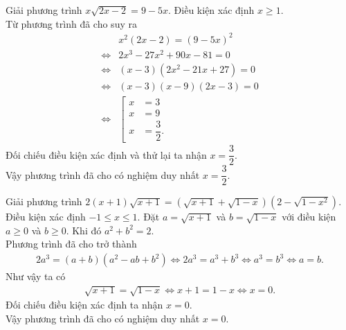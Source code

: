 \begin{bt}%
	Giải phương trình $x \sqrt{2x - 2} = 9 - 5x$.
	\loigiai
	{
		Điều kiện xác định $x \geq 1$.\\
		Từ phương trình đã cho suy ra
		\begin{align*}
		& x^2(2x - 2) = (9 - 5x)^2 \\
		\Leftrightarrow & 2x^3 - 27x^2 + 90x - 81 = 0 \\
		\Leftrightarrow & (x - 3)(2x^2 - 21x + 27) = 0 \\
		\Leftrightarrow & (x - 3)(x - 9)(2x - 3) = 0 \\
		\Leftrightarrow & \left[\begin{aligned} x &= 3 \\ x &= 9 \\ x &= \dfrac{3}{2}. \end{aligned}\right.
		\end{align*}
		Đối chiếu điều kiện xác định và thử lại ta nhận $x = \dfrac{3}{2}$.\\
		Vậy phương trình đã cho có nghiệm duy nhất $x = \dfrac{3}{2}$.
	}
\end{bt}


\begin{bt}%
	Giải phương trình $2(x + 1) \sqrt{x + 1} = \left( \sqrt{x + 1} + \sqrt{1 - x} \right)\left( 2 - \sqrt{1 - x^2} \right)$.
	\loigiai
	{
		Điều kiện xác định $-1 \leq x \leq 1$.
		Đặt $a = \sqrt{x + 1}$ và $b = \sqrt{1 - x}$ với điều kiện $a \geq 0$ và $b \geq 0$. Khi đó $a^2 + b^2 = 2$.\\
		Phương trình đã cho trở thành
		\begin{align*}
		2a^3 = (a + b)(a^2 - ab + b^2) \Leftrightarrow 2a^3 = a^3 + b^3 \Leftrightarrow a^3 = b^3 \Leftrightarrow a = b.
		\end{align*}
		Như vậy ta có
		\begin{align*}
		\sqrt{x + 1} = \sqrt{1 - x} \Leftrightarrow x + 1 = 1 - x \Leftrightarrow x = 0.
		\end{align*}
		Đối chiếu điều kiện xác định ta nhận $x = 0$.\\
		Vậy phương trình đã cho có nghiệm duy nhất $x = 0$.
	}
\end{bt}


